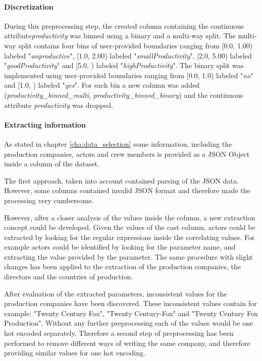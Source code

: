 \paragraph{Discretization}
During this preprocessing step, the created column containing the continuous attribute\textit{productivity} was binned using a binary and a multi-way split. The multi-way split contains four bins of user-provided boundaries ranging from [0.0, 1.00) labeled "\textit{unproductive}", [1.0, 2.00) labeled "\textit{smallProductivity}", [2.0, 5.00) labeled "\textit{goodProductivity}" and [5.0, \infty) labeled "\textit{highProductivity}". The binary split was implemented using user-provided boundaries ranging from [0.0, 1.0) labeled "\textit{no}" and [1.0, \infty) labeled "\textit{yes}". For each bin a new column was added (\textit{productivity_binned_multi}, \textit{productivity_binned_binary}) and the continuous attribute \textit{productivity} was dropped.

\paragraph{Extracting information}
As stated in chapter \ref{cha:data_selection} some information, including the production companies, actors and crew members is provided as a JSON Object inside a column of the dataset. 

The first approach, taken into account contained parsing of the JSON data. However, some columns contained invalid JSON format and therefore made the processing very cumbersome.

However, after a closer analysis of the values inside the column, a new extraction concept could be developed. Given the values of the cast column, actors could be extracted by looking for the regular expressions inside the correlating values. For example actors could be identified by looking for the parameter name, and extracting the value provided by the parameter. The same procedure with slight changes has been applied to the extraction of the production companies, the directors and the countries of production.

After evaluation of the extracted parameters, inconsistent values for the production companies have been discovered. These inconsistent values contain for example: "Twenty Century Fox", "Twenty Century-Fox" and "Twenty Century Fox Production". Without any further preprocessing each of the values would be one hot encoded separately. Therefore a second step of preprocessing has been performed to remove different ways of writing the same company, and therefore providing similar values for one hot encoding.
 
